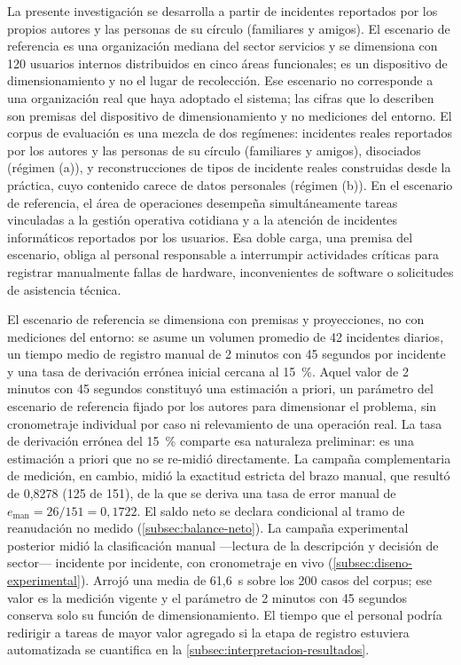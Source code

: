 La presente investigación se desarrolla a partir de incidentes reportados por los propios autores y las personas de su círculo (familiares y amigos). El escenario de referencia es una organización mediana del sector servicios y se dimensiona con 120 usuarios internos distribuidos en cinco áreas funcionales; es un dispositivo de dimensionamiento y no el lugar de recolección. Ese escenario no corresponde a una organización real que haya adoptado el sistema; las cifras que lo describen son premisas del dispositivo de dimensionamiento y no mediciones del entorno. El corpus de evaluación es una mezcla de dos regímenes: incidentes reales reportados por los autores y las personas de su círculo (familiares y amigos), disociados (régimen (a)), y reconstrucciones de tipos de incidente reales construidas desde la práctica, cuyo contenido carece de datos personales (régimen (b)). En el escenario de referencia, el área de operaciones desempeña simultáneamente tareas vinculadas a la gestión operativa cotidiana y a la atención de incidentes informáticos reportados por los usuarios. Esa doble carga, una premisa del escenario, obliga al personal responsable a interrumpir actividades críticas para registrar manualmente fallas de hardware, inconvenientes de software o solicitudes de asistencia técnica.

El escenario de referencia se dimensiona con premisas y proyecciones, no con mediciones del entorno: se asume un volumen promedio de 42 incidentes diarios, un tiempo medio de registro manual de 2 minutos con 45 segundos por incidente y una tasa de derivación errónea inicial cercana al 15~\%. Aquel valor de 2 minutos con 45 segundos constituyó una estimación a priori, un parámetro del escenario de referencia fijado por los autores para dimensionar el problema, sin cronometraje individual por caso ni relevamiento de una operación real. La tasa de derivación errónea del 15~\% comparte esa naturaleza preliminar: es una estimación a priori que no se re-midió directamente. La campaña complementaria de medición, en cambio, midió la exactitud estricta del brazo manual, que resultó de 0,8278 (125 de 151), de la que se deriva una tasa de error manual de \(e_{\mathrm{man}} = 26/151 = 0{,}1722\). El saldo neto se declara condicional al tramo de reanudación no medido (\autoref{subsec:balance-neto}). La campaña experimental posterior midió la clasificación manual ---lectura de la descripción y decisión de sector--- incidente por incidente, con cronometraje en vivo (\autoref{subsec:diseno-experimental}). Arrojó una media de 61,6~s sobre los 200 casos del corpus; ese valor es la medición vigente y el parámetro de 2 minutos con 45 segundos conserva solo su función de dimensionamiento. El tiempo que el personal podría redirigir a tareas de mayor valor agregado si la etapa de registro estuviera automatizada se cuantifica en la \autoref{subsec:interpretacion-resultados}.

